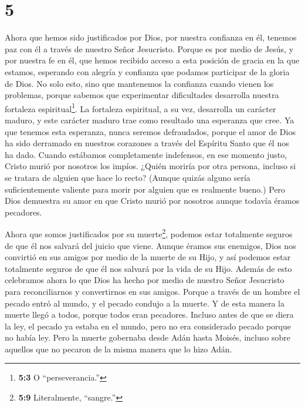 \hypertarget{section-4}{%
\section{5}\label{section-4}}

 Ahora que hemos sido justificados por Dios, por nuestra
confianza en él, tenemos paz con él a través de nuestro Señor
Jesucristo.  Porque es por medio de Jesús, y por nuestra fe
en él, que hemos recibido acceso a esta posición de gracia en la que
estamos, esperando con alegría y confianza que podamos participar de la
gloria de Dios.  No solo esto, sino que mantenemos la
confianza cuando vienen los problemas, porque sabemos que experimentar
dificultades desarrolla nuestra fortaleza espiritual\footnote{\textbf{5:3}
  O ``perseverancia.''}.  La fortaleza espiritual, a su vez,
desarrolla un carácter maduro, y este carácter maduro trae como
resultado una esperanza que cree.  Ya que tenemos esta
esperanza, nunca seremos defraudados, porque el amor de Dios ha sido
derramado en nuestros corazones a través del Espíritu Santo que él nos
ha dado.  Cuando estábamos completamente indefensos, en ese
momento justo, Cristo murió por nosotros los impíos.  ¿Quién
moriría por otra persona, incluso si se tratara de alguien que hace lo
recto? (Aunque quizás alguno sería suficientemente valiente para morir
por alguien que es realmente bueno.)  Pero Dios demuestra su
amor en que Cristo murió por nosotros aunque todavía éramos pecadores.

 Ahora que somos justificados por su muerte\footnote{\textbf{5:9}
  Literalmente, ``sangre.''}, podemos estar totalmente seguros de que él
nos salvará del juicio que viene.  Aunque éramos sus
enemigos, Dios nos convirtió en sus amigos por medio de la muerte de su
Hijo, y así podemos estar totalmente seguros de que él nos salvará por
la vida de su Hijo.  Además de esto celebramos ahora lo que
Dios ha hecho por medio de nuestro Señor Jesucristo para reconciliarnos
y convertirnos en sus amigos.  Porque a través de un hombre
el pecado entró al mundo, y el pecado condujo a la muerte. Y de esta
manera la muerte llegó a todos, porque todos eran pecadores.
 Incluso antes de que se diera la ley, el pecado ya estaba
en el mundo, pero no era considerado pecado porque no había ley.
 Pero la muerte gobernaba desde Adán hasta Moisés, incluso
sobre aquellos que no pecaron de la misma manera que lo hizo Adán.

